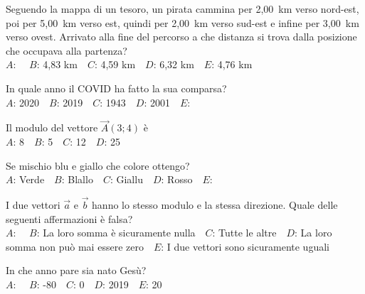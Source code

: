 \mcquestionheader Seguendo la mappa di un tesoro, un pirata cammina per 2,00~km verso nord-est, poi per 5,00~km verso est, quindi per 2,00~km verso sud-est e infine per 3,00~km verso ovest. Arrivato alla fine del percorso a che distanza si trova dalla posizione che occupava alla partenza?\\
{$A$}: \ \ {$B$}: 4,83 km\ \ {$C$}: 4,59 km\ \ {$D$}: 6,32 km\ \ {$E$}: 4,76 km\ \ 

\mcquestionfooter



\def\mcquestionnumber{4}


\mcquestionheader In quale anno il COVID ha fatto la sua comparsa?\\
{$A$}: 2020\ \ {$B$}: 2019\ \ {$C$}: 1943\ \ {$D$}: 2001\ \ {$E$}: \ \ 

\mcquestionfooter



\def\mcquestionnumber{5}


\mcquestionheader Il modulo del vettore $\vec{A}(3;4)$ è\\
{$A$}: 8\ \ {$B$}: 5\ \ {$C$}: 12\ \ {$D$}: 25\ \ 

\mcquestionfooter



\def\mcquestionnumber{6}


\mcquestionheader Se mischio blu e giallo che colore ottengo?\\
{$A$}: Verde\ \ {$B$}: Blallo\ \ {$C$}: Giallu\ \ {$D$}: Rosso\ \ {$E$}: \ \ 

\mcquestionfooter



\def\mcquestionnumber{7}


\mcquestionheader I due vettori $\vec{a}$ e $\vec{b}$ hanno lo stesso modulo e la stessa direzione. Quale delle seguenti affermazioni è falsa?\\
{$A$}: \ \ {$B$}: La loro somma è sicuramente nulla\ \ {$C$}: Tutte le altre\ \ {$D$}: La loro somma non può mai essere zero\ \ {$E$}: I due vettori sono sicuramente uguali\ \ 

\mcquestionfooter



\def\mcquestionnumber{8}


\mcquestionheader In che anno pare sia nato Gesù?\\
{$A$}: \ \ {$B$}: -80\ \ {$C$}: 0\ \ {$D$}: 2019\ \ {$E$}: 20\ \ 

\mcquestionfooter



